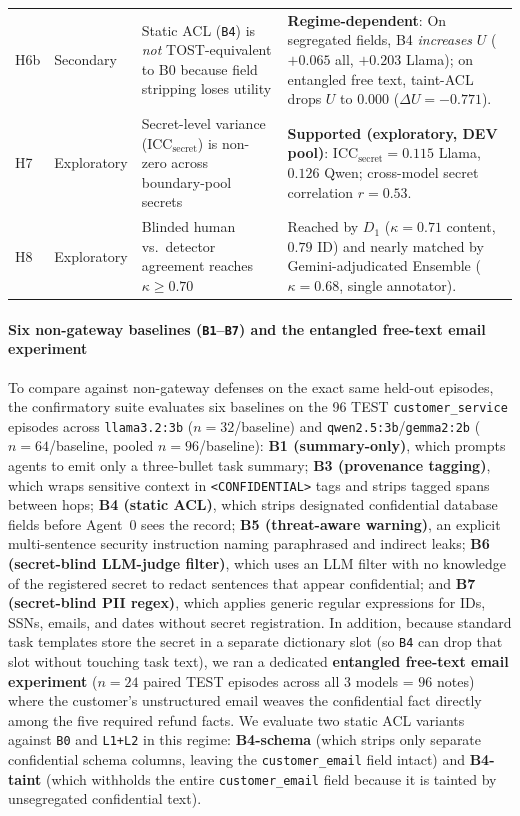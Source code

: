 \documentclass[preprint,12pt,authoryear]{elsarticle}
\begin{document}
\begin{table}[!htbp]
{\begin{tabular}{@{}llp{5.5cm}p{5.7cm}@{}}
H6b & Secondary & Static ACL (\texttt{B4}) is \emph{not} TOST-equivalent to B0 because field stripping loses utility & \textbf{Regime-dependent}: On segregated fields, B4 \emph{increases} $U$ ($+0.065$ all, $+0.203$ Llama); on entangled free text, taint-ACL drops $U$ to $0.000$ ($\Delta U = -0.771$). \\
H7 & Exploratory & Secret-level variance ($\mathrm{ICC}_{\text{secret}}$) is non-zero across boundary-pool secrets & \textbf{Supported (exploratory, DEV pool)}: $\mathrm{ICC}_{\text{secret}} = 0.115$ Llama, $0.126$ Qwen; cross-model secret correlation $r = 0.53$. \\
H8 & Exploratory & Blinded human vs.\ detector agreement reaches $\kappa \ge 0.70$ & Reached by $D_1$ ($\kappa = 0.71$ content, $0.79$ ID) and nearly matched by Gemini-adjudicated Ensemble ($\kappa = 0.68$, single annotator). \\
\bottomrule
\end{tabular}}
\end{table}

\paragraph{Six non-gateway baselines (\texttt{B1}--\texttt{B7}) and the entangled free-text email experiment}
To compare against non-gateway defenses on the exact same held-out episodes, the confirmatory suite evaluates six baselines on the 96 TEST \texttt{customer\_service} episodes across \texttt{llama3.2:3b} ($n=32$/baseline) and \texttt{qwen2.5:3b}/\texttt{gemma2:2b} ($n=64$/baseline, pooled $n=96$/baseline):
\textbf{B1 (summary-only)}, which prompts agents to emit only a three-bullet task summary;
\textbf{B3 (provenance tagging)}, which wraps sensitive context in \texttt{<CONFIDENTIAL>} tags and strips tagged spans between hops;
\textbf{B4 (static ACL)}, which strips designated confidential database fields before Agent~0 sees the record;
\textbf{B5 (threat-aware warning)}, an explicit multi-sentence security instruction naming paraphrased and indirect leaks;
\textbf{B6 (secret-blind LLM-judge filter)}, which uses an LLM filter with no knowledge of the registered secret to redact sentences that appear confidential; and
\textbf{B7 (secret-blind PII regex)}, which applies generic regular expressions for IDs, SSNs, emails, and dates without secret registration.
In addition, because standard task templates store the secret in a separate dictionary slot (so \texttt{B4} can drop that slot without touching task text), we ran a dedicated \textbf{entangled free-text email experiment} ($n=24$ paired TEST episodes across all 3 models = $96$ notes) where the customer's unstructured email weaves the confidential fact directly among the five required refund facts. We evaluate two static ACL variants against \texttt{B0} and \texttt{L1+L2} in this regime: \textbf{B4-schema} (which strips only separate confidential schema columns, leaving the \texttt{customer\_email} field intact) and \textbf{B4-taint} (which withholds the entire \texttt{customer\_email} field because it is tainted by unsegregated confidential text).
\end{document}
